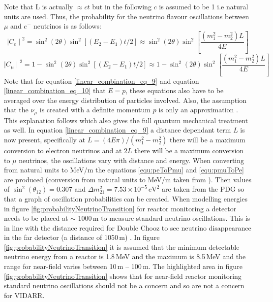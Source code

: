 Note that L is actually $\approx ct$ but in the following $c$ is assumed to be 1 i.e natural units are used. Thus, the probability for the neutrino flavour oscillations between $\mu$ and $e^-$ neutrinos is as follows: 
\begin{equation}
   {\mid{C_e}\mid}^2 = \sin^2(2\theta)\sin^2[(E_2-E_1)t/2] \approx \sin^2(2\theta)\sin^2\left[\frac{(m_1^2-m_2^2)L}{4E}\right]
    \label{linear_combination_eq_9}
\end{equation}
\begin{equation}
    {\mid{C_\mu}\mid}^2 = 1 - \sin^2(2\theta)\sin^2[(E_2-E_1)t/2] \approx 1 - \sin^2(2\theta)\sin^2\left[\frac{(m_1^2-m_2^2)L}{4E}\right]
    \label{linear_combination_eq_10}
\end{equation}
Note that for equation \ref{linear_combination_eq_9} and equation \ref{linear_combination_eq_10} that $E = p$, these equations also have to be averaged over the energy distribution of particles involved. Also, the assumption that the $\nu_\mu$ is created with a definite momentum $p$ is only an approximation \cite{sassaroli1999neutrino}. This explanation follows \cite{sassaroli1999neutrino} which also gives the full quantum mechanical treatment as well. In equation \ref{linear_combination_eq_9} a distance dependant term $L$ is now present, specifically at $L = (4E\pi) / (m_1^2 - m_2^2)$ there will be a maximum conversion to electron neutrinos and at $2L$ there will be a maximum conversion to $\mu$ neutrinos, the oscillations vary with distance and energy. When converting from natural units to MeV/m the equations \ref{equ:peToPmu} and \ref{equ:pmuToPe} are produced (conversion from natural units to MeV/m taken from \cite{steveBoydLectureNotes}). Then values of $\sin^2(\theta_{12}) = 0.307$ and $\Delta m^2_{21} = 7.53 \times 10^{-5}\,\textrm{eV}^2$ are taken from the PDG \cite{Zyla_pdg_2020} so that a graph of oscillation probabilities can be created. When modelling energies in figure \ref{fig:probabilityNeutrinoTransition} for reactor monitoring a detector needs to be placed at $\sim$ 1000\,m to measure standard neutrino oscillations. This is in line with the distance required for Double Chooz to see neutrino disappearance in the far detector (a distance of 1050\,m) \cite{lasserre2006} \cite{Abe_2012} \cite{abe2014improved}. In figure \ref{fig:probabilityNeutrinoTransition} it is assumed that the minimum detectable neutrino energy from a reactor is 1.8\,MeV and the maximum is 8.5\,MeV and the range for near-field varies between 10\,m -- 100\,m. The highlighted area in figure \ref{fig:probabilityNeutrinoTransition} shows that for near-field reactor monitoring standard neutrino oscillations should not be a concern and so are not a concern for VIDARR. 


